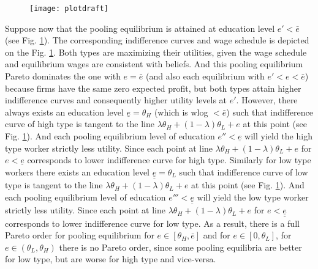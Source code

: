 \documentclass[a4paper]{article}
\begin{document}
\begin{enumerate}
\begin{enumerate}[(a)]
	\begin{figure}[H]
		\centering
		\texttt{[image: plotdraft]}
		\caption{}\label{fig5}
	\end{figure}
Suppose now that the pooling equilibrium is attained at education level $e' < \bar{e}$ (see Fig. \ref{fig5}). The corresponding indifference curves and wage schedule is depicted on the Fig. \ref{fig5}. Both types are maximizing their utilities, given the wage schedule and equilibrium wages are consistent with beliefs. And this pooling equilibrium Pareto dominates the one with $e = \bar{e}$ (and also each equilibrium with $e' < e < \bar{e}$) because firms have the same zero expected profit, but both types attain higher indifference curves and consequently higher utility levels at $e'$. However, there always exists an education level $\underline{e} = \theta_H$ (which is wlog $< \bar{e}$) such that indifference curve of high type is tangent to the line $\lambda \theta_H + (1 - \lambda)\theta_L + e$ at this point (see Fig. \ref{fig5}). And each pooling  equilibrium level of education $e'' < \underline{e}$ will yield the high type worker strictly less utility. Since each point at line $\lambda \theta_H + (1 - \lambda) \theta_L + e$ for $e < \underline{e}$ corresponds to lower indifference curve for high type. Similarly for low type workers there exists an education level $\underline{\underline{e}} = \theta_L$ such that indifference curve of low type is tangent to the line $\lambda \theta_H + (1 - \lambda)\theta_L + e$ at this point (see Fig. \ref{fig5}). And each pooling  equilibrium level of education $e''' < \underline{\underline{e}}$ will yield the low type worker strictly less utility. Since each point at line $\lambda \theta_H + (1 - \lambda) \theta_L + e$ for $e < \underline{\underline{e}}$ corresponds to lower indifference curve for low type. As a result, there is a full Pareto order for pooling equilibrium for $e \in [\theta_H, \bar{e}]$ and for $e \in [0, \theta_L]$, for $e \in (\theta_L, \theta_H)$ there is no Pareto order, since some pooling equilibria are better for low type, but are worse for high type and vice-versa. 


\end{enumerate}
\end{enumerate}
\end{document}
